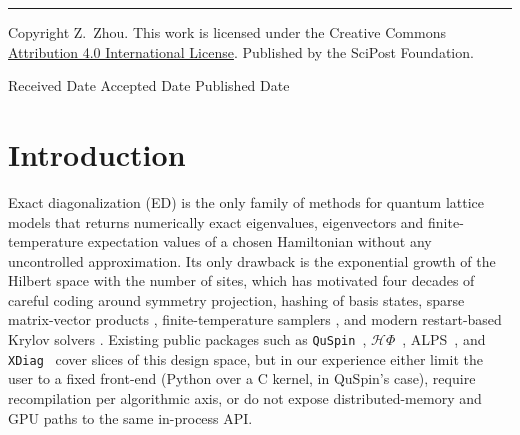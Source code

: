 \documentclass[submission, PhysCodeb]{SciPost}
\begin{document}
\vspace{\baselineskip}

\noindent\textcolor{white!90!black}{\rule{\linewidth}{0.4pt}}

\noindent\begin{minipage}{0.4\textwidth}
\raggedright
Copyright Z.\ Zhou. \newline\newline
This work is licensed under the Creative Commons \newline
\href{http://creativecommons.org/licenses/by/4.0/}{Attribution 4.0 International License}. \newline
Published by the SciPost Foundation.
\end{minipage}
\begin{minipage}{0.6\textwidth}
\raggedleft
Received Date \newline Accepted Date \newline Published Date
\end{minipage}

\linenumbers

\vspace{1\baselineskip}

\tableofcontents
\thispagestyle{fancy}

\vspace{2\baselineskip}

\section{Introduction}
\label{sec:intro}

Exact diagonalization (ED) is the only family of methods for quantum
lattice models that returns numerically exact eigenvalues, eigenvectors
and finite-temperature expectation values of a chosen Hamiltonian
without any uncontrolled approximation. Its only drawback is the
exponential growth of the Hilbert space with the number of sites,
which has motivated four decades of careful coding around symmetry
projection, hashing of basis states, sparse matrix-vector products
\cite{Lin1990Hashing,LinGagliano1993,Sandvik2010Lectures,Lauchli2011LectureNotes,Wietek2018Symmetries},
finite-temperature samplers
\cite{Jaklic1994FTLM,Aichhorn2003LTLM,Hams2000mTPQ,Sugiura2012mTPQ,Sugiura2013cTPQ},
and modern restart-based Krylov solvers
\cite{Lehoucq1998ARPACK,Stewart2002,Wu2000TRL,Saad2011}.
Existing public packages such as
\texttt{QuSpin}~\cite{Weinberg2017QuSpin,Weinberg2019QuSpin2},
$\mathcal{H}\Phi$~\cite{Wietek2018HPhi},
ALPS~\cite{Bauer2011ALPS}, and
\texttt{XDiag}~\cite{Wietek2025XDiag} cover slices of this design
space, but in our experience either limit the user to a fixed
front-end (Python over a C kernel, in QuSpin's case),
require recompilation per algorithmic axis, or
do not expose distributed-memory and GPU paths to the same in-process
API.
\end{document}
